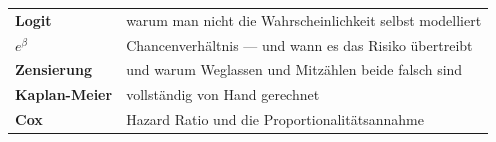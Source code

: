 \begin{merksatz}
\begin{center}
\renewcommand{\arraystretch}{1.5}
\begin{tabular}{@{}P{3.0cm}P{5.6cm}@{}}
\toprule
\textbf{Logit} & warum man nicht die Wahrscheinlichkeit selbst modelliert\\
\textbf{$e^{\beta}$} & Chancenverhältnis --- und wann es das Risiko übertreibt\\
\textbf{Zensierung} & und warum Weglassen und Mitzählen beide falsch sind\\
\textbf{Kaplan-Meier} & vollständig von Hand gerechnet\\
\textbf{Cox} & Hazard Ratio und die Proportionalitätsannahme\\
\bottomrule
\end{tabular}
\end{center}

\begin{center}
\begin{minipage}{0.88\textwidth}
\end{minipage}
\end{center}
\end{merksatz}
